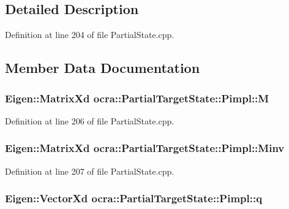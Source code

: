 \subsection{Detailed Description}


Definition at line 204 of file Partial\+State.\+cpp.



\subsection{Member Data Documentation}
\subsubsection[{\texorpdfstring{M}{M}}]{\setlength{\rightskip}{0pt plus 5cm}Eigen\+::\+Matrix\+Xd ocra\+::\+Partial\+Target\+State\+::\+Pimpl\+::M}\hypertarget{structocra_1_1PartialTargetState_1_1Pimpl_acf8d5f65cf416eda2285044fb31e16dd}{}\label{structocra_1_1PartialTargetState_1_1Pimpl_acf8d5f65cf416eda2285044fb31e16dd}


Definition at line 206 of file Partial\+State.\+cpp.

\subsubsection[{\texorpdfstring{Minv}{Minv}}]{\setlength{\rightskip}{0pt plus 5cm}Eigen\+::\+Matrix\+Xd ocra\+::\+Partial\+Target\+State\+::\+Pimpl\+::\+Minv}\hypertarget{structocra_1_1PartialTargetState_1_1Pimpl_a14905360b00dea81b81fd48960fbe7a5}{}\label{structocra_1_1PartialTargetState_1_1Pimpl_a14905360b00dea81b81fd48960fbe7a5}


Definition at line 207 of file Partial\+State.\+cpp.

\subsubsection[{\texorpdfstring{q}{q}}]{\setlength{\rightskip}{0pt plus 5cm}Eigen\+::\+Vector\+Xd ocra\+::\+Partial\+Target\+State\+::\+Pimpl\+::q}\hypertarget{structocra_1_1PartialTargetState_1_1Pimpl_a0d72ffd9b45ff335dee37874459dfc8d}{}\label{structocra_1_1PartialTargetState_1_1Pimpl_a0d72ffd9b45ff335dee37874459dfc8d}


